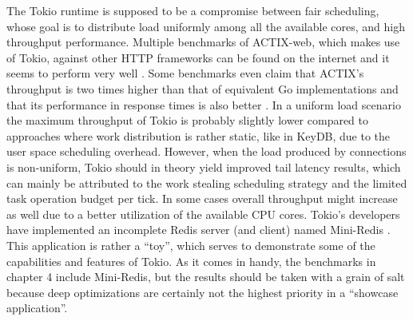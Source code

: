 The Tokio runtime is supposed to be a compromise between fair scheduling, whose goal is to distribute load uniformly among all the available cores, and high throughput performance.
Multiple benchmarks of ACTIX-web, which makes use of Tokio, against other HTTP frameworks can be found on the internet and it seems to perform very well \cite{andre:tokio}. Some benchmarks even claim that ACTIX’s throughput is two times higher than that of equivalent Go implementations and that its performance in response times is also better \cite{techempower:tokio}. \newline
In a uniform load scenario the maximum throughput of Tokio is probably slightly lower compared to approaches where work distribution is rather static, like in KeyDB, due to the user space scheduling overhead. However, when the load produced by connections is non-uniform, Tokio should in theory yield improved tail latency results, which can mainly be attributed to the work stealing scheduling strategy and the limited task operation budget per tick. In some cases overall throughput might increase as well due to a better utilization of the available CPU cores.  \newline
Tokio’s developers have implemented an incomplete Redis server (and client) named Mini-Redis \cite{soft:miniredis}. This application is rather a “toy”, which serves to demonstrate some of the capabilities and features of Tokio. As it comes in handy, the benchmarks in chapter 4 include Mini-Redis, but the results should be taken with a grain of salt because deep optimizations are certainly not the highest priority in a “showcase application”.  

